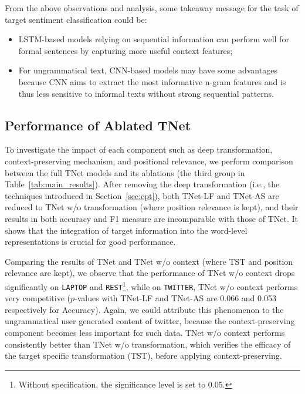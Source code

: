 \documentclass[11pt,a4paper]{article}
\begin{document}
From the above observations and analysis, some takeaway message for the task of target sentiment classification could be: 
\begin{itemize}
\item LSTM-based models relying on sequential information can perform well for formal sentences by capturing more useful context features; 
\item For ungrammatical text, CNN-based models may have some advantages because CNN aims to extract the most informative n-gram features and is thus less sensitive to informal texts without strong sequential patterns.
\end{itemize}







\subsection{Performance of Ablated TNet}



To investigate the impact of each component such as deep transformation, context-preserving mechanism, and positional relevance, we perform comparison between the full TNet models and its ablations (the third group in Table~\ref{tab:main_results}). After removing the deep transformation (i.e., the techniques introduced in Section~\ref{sec:cpt}), both TNet-LF and TNet-AS are reduced to TNet w/o transformation (where position relevance is kept), and their results in both accuracy and F1 measure are incomparable with those of TNet. It shows that the integration of target information into the word-level representations is crucial for good performance. 

Comparing the results of TNet and TNet w/o context (where TST and position relevance are kept), we observe that the performance of TNet w/o context drops significantly on \texttt{LAPTOP} and \texttt{REST}\footnote{Without specification, the significance level is set to 0.05.}, while on \texttt{TWITTER}, TNet w/o context performs very competitive ($p$-values with TNet-LF and TNet-AS are 0.066 and 0.053 respectively for Accuracy). Again, we could attribute this phenomenon to the ungrammatical user generated content of twitter, because the context-preserving component becomes less important for such data. TNet w/o context performs consistently better than TNet w/o transformation, which verifies the efficacy of the target specific transformation (TST), before applying context-preserving. 
\end{document}
